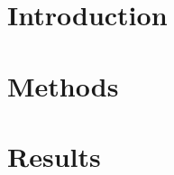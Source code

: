 \documentclass{article}
\begin{document}
    \maketitle

    \tableofcontents

    \section{Introduction}
    

    \section{Methods}
    

    \section{Results}
    
\end{document}
